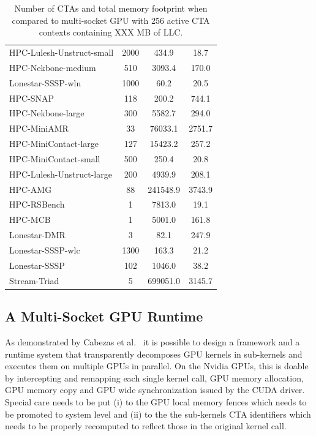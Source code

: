 \begin{table}[t]
\begin{small}
\begin{tabular}{lccc}
HPC-Lulesh-Unstruct-small & 2000 & 434.9 & 18.7 \\
HPC-Nekbone-medium & 510 & 3093.4 & 170.0 \\
Lonestar-SSSP-wln & 1000 & 60.2 & 20.5 \\
HPC-SNAP & 118 & 200.2 & 744.1 \\
HPC-Nekbone-large & 300 & 5582.7 & 294.0 \\
HPC-MiniAMR & 33 & 76033.1 & 2751.7 \\
HPC-MiniContact-large & 127 & 15423.2 & 257.2 \\
HPC-MiniContact-small & 500 & 250.4 & 20.8 \\
HPC-Lulesh-Unstruct-large & 200 & 4939.9 & 208.1 \\
HPC-AMG & 88 & 241548.9 & 3743.9 \\
HPC-RSBench & 1 & 7813.0 & 19.1 \\
HPC-MCB & 1 & 5001.0 & 161.8 \\
Lonestar-DMR & 3 & 82.1 & 247.9 \\
Lonestar-SSSP-wlc & 1300 & 163.3 & 21.2 \\
Lonestar-SSSP & 102 & 1046.0 & 38.2 \\
Stream-Triad & 5 & 699051.0 & 3145.7 \\
\toprule
\end{tabular}
\caption{Number of CTAs and total memory footprint when compared to multi-socket GPU with 256 active CTA contexts containing XXX MB of LLC.}
\label{tab:numctas}
\end{small}
\end{table}



\subsection{A Multi-Socket GPU Runtime}

As demonstrated by Cabezas et al.~\cite{Cabezas2015} it is possible to design 
a framework and a runtime system that transparently decomposes GPU kernels in 
sub-kernels and executes them on multiple GPUs in parallel. On the Nvidia 
GPUs, this is doable by intercepting and remapping each single kernel call, 
GPU memory allocation, GPU memory copy and GPU wide synchronization issued by 
the CUDA driver. Special care needs to be put (i) to the GPU local memory 
fences which needs to be promoted to system level and (ii) to the the 
sub-kernels CTA identifiers which needs to be properly recomputed to 
reflect those in the original kernel call. 
 
